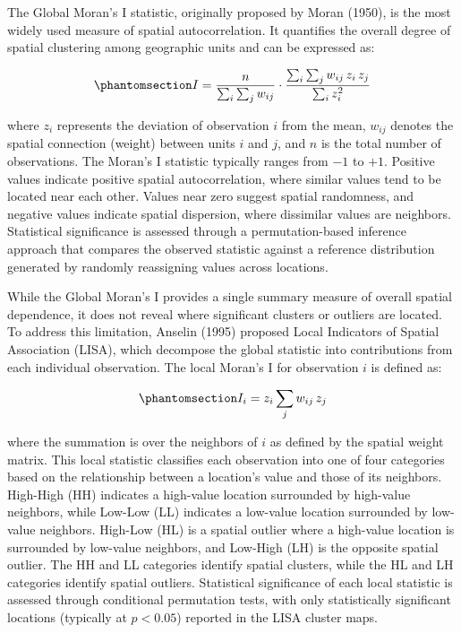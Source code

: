 \documentclass[
  letterpaper,
  DIV=11,
  numbers=noendperiod]{scrartcl}
\begin{document}
The Global Moran's I statistic, originally proposed by Moran (1950), is
the most widely used measure of spatial autocorrelation. It quantifies
the overall degree of spatial clustering among geographic units and can
be expressed as:

\begin{equation}\phantomsection\label{eq-moran}{
I=\frac{n}{\sum_i \sum_j w_{ij}} \cdot \frac{\sum_i \sum_j w_{ij} \, z_i \, z_j}{\sum_i z_i^2}
}\end{equation}

where \(z_i\) represents the deviation of observation \(i\) from the
mean, \(w_{ij}\) denotes the spatial connection (weight) between units
\(i\) and \(j\), and \(n\) is the total number of observations. The
Moran's I statistic typically ranges from \(-1\) to \(+1\). Positive
values indicate positive spatial autocorrelation, where similar values
tend to be located near each other. Values near zero suggest spatial
randomness, and negative values indicate spatial dispersion, where
dissimilar values are neighbors. Statistical significance is assessed
through a permutation-based inference approach that compares the
observed statistic against a reference distribution generated by
randomly reassigning values across locations.

While the Global Moran's I provides a single summary measure of overall
spatial dependence, it does not reveal where significant clusters or
outliers are located. To address this limitation, Anselin (1995)
proposed Local Indicators of Spatial Association (LISA), which decompose
the global statistic into contributions from each individual
observation. The local Moran's I for observation \(i\) is defined as:

\begin{equation}\phantomsection\label{eq-lisa}{
I_i = z_i \sum_j w_{ij} \, z_j
}\end{equation}

where the summation is over the neighbors of \(i\) as defined by the
spatial weight matrix. This local statistic classifies each observation
into one of four categories based on the relationship between a
location's value and those of its neighbors. High-High (HH) indicates a
high-value location surrounded by high-value neighbors, while Low-Low
(LL) indicates a low-value location surrounded by low-value neighbors.
High-Low (HL) is a spatial outlier where a high-value location is
surrounded by low-value neighbors, and Low-High (LH) is the opposite
spatial outlier. The HH and LL categories identify spatial clusters,
while the HL and LH categories identify spatial outliers. Statistical
significance of each local statistic is assessed through conditional
permutation tests, with only statistically significant locations
(typically at \(p < 0.05\)) reported in the LISA cluster maps.
\end{document}

